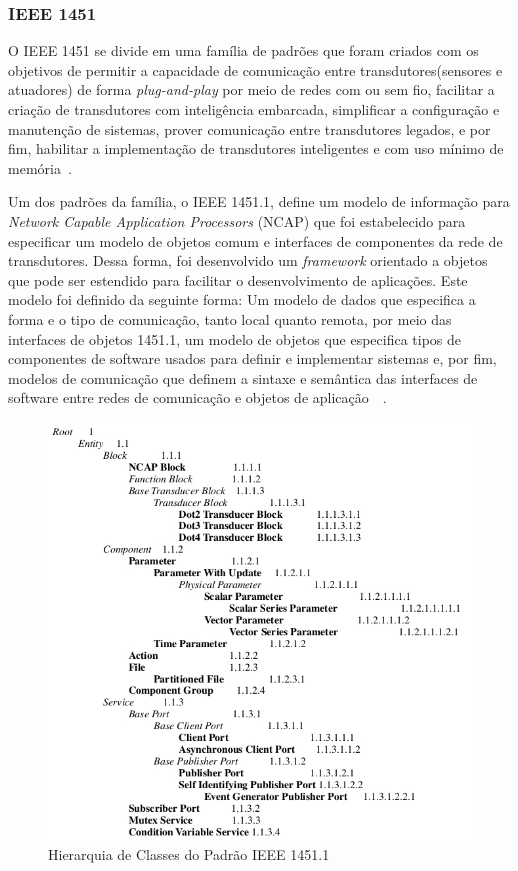 \subsubsection{IEEE 1451}
O IEEE 1451 se divide em uma família de padrões que foram criados com os objetivos de permitir a capacidade de comunicação entre transdutores(sensores e atuadores) de forma \emph{plug-and-play} por meio de redes com ou sem fio, facilitar a criação de transdutores com inteligência embarcada, simplificar a configuração e manutenção de sistemas, prover comunicação entre transdutores legados, e por fim, habilitar a implementação de transdutores inteligentes e com uso mínimo de memória~\cite{ieee1451journal}.

Um dos padrões da família, o IEEE 1451.1, define um modelo de informação para \emph{Network Capable Application Processors} (NCAP) que foi estabelecido para especificar um modelo de objetos comum e interfaces de componentes da rede de transdutores. Dessa forma, foi desenvolvido um \emph{framework} orientado a objetos que pode ser estendido para facilitar o desenvolvimento de aplicações. Este modelo foi definido da seguinte forma: Um modelo de dados que especifica a forma e o tipo de comunicação, tanto local quanto remota, por meio das interfaces de objetos 1451.1, um modelo de objetos que especifica tipos de componentes de software usados para definir e implementar sistemas e, por fim, modelos de comunicação que definem a sintaxe e semântica das interfaces de software entre redes de comunicação e objetos de aplicação~\cite{ieeeOO1451}~\cite{ieee1451monitoring}.

\begin{figure}[ht]
\center
\includegraphics[scale=0.5]{imagens/ieee1451-classHierarchy}
\caption{Hierarquia de Classes do Padrão IEEE 1451.1}
\label{fig:classHierarchy}
\end{figure}

